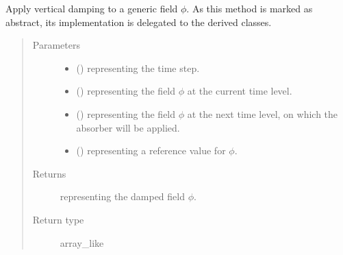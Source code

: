 \documentclass[letterpaper,10pt,english]{sphinxmanual}
\begin{document}
\begin{fulllineitems}
\begin{fulllineitems}
\label{\detokenize{api:dycore.vertical_damping.VerticalDamping.apply}}
Apply vertical damping to a generic field \(\phi\).
As this method is marked as abstract, its implementation is delegated to the derived classes.
\begin{quote}\begin{description}
\item[{Parameters}] \leavevmode\begin{itemize}
\item {} 
 () \textendash{}  representing the time step.

\item {} 
 () \textendash{}  representing the field \(\phi\) at the current time level.

\item {} 
 () \textendash{}  representing the field \(\phi\) at the next time level, on
which the absorber will be applied.

\item {} 
 () \textendash{}  representing a reference value for \(\phi\).

\end{itemize}

\item[{Returns}] \leavevmode
{} representing the damped field \(\phi\).

\item[{Return type}] \leavevmode
array\_like

\end{description}\end{quote}


\end{fulllineitems}
\end{fulllineitems}
\end{document}
